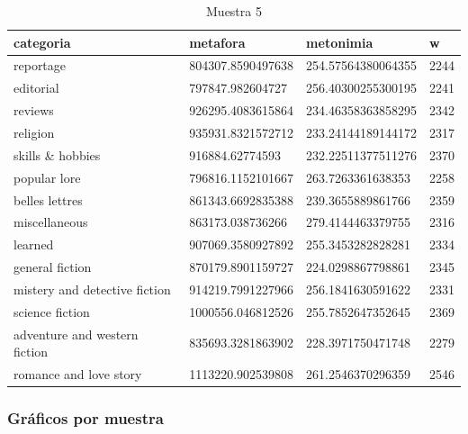 \documentclass[twoside]{article}
\begin{document}
\begin{center}
\begin{longtable}{| p{} | p{} | p{}|p{}|}
\caption{Muestra 5}
    \hline
        categoria & metafora & metonimia & w \\ \hline
        reportage & 804307.8590497638 & 254.57564380064355 & 2244 \\ \hline
        editorial & 797847.982604727 & 256.40300255300195 & 2241 \\ \hline
        reviews & 926295.4083615864 & 234.46358363858295 & 2342 \\ \hline
        religion & 935931.8321572712 & 233.24144189144172 & 2317 \\ \hline
        skills \& hobbies & 916884.62774593 & 232.22511377511276 & 2370 \\ \hline
        popular lore & 796816.1152101667 & 263.7263361638353 & 2258 \\ \hline
        belles lettres & 861343.6692835388 & 239.3655889861766 & 2359 \\ \hline
        miscellaneous & 863173.038736266 & 279.4144463379755 & 2316 \\ \hline
        learned & 907069.3580927892 & 255.3453282828281 & 2334 \\ \hline
        general fiction & 870179.8901159727 & 224.0298867798861 & 2345 \\ \hline
        mistery and detective fiction & 914219.7991227966 & 256.1841630591622 & 2331 \\ \hline
        science fiction & 1000556.046812526 & 255.7852647352645 & 2369 \\ \hline
        adventure and western fiction & 835693.3281863902 & 228.3971750471748 & 2279 \\ \hline
        romance and love story & 1113220.902539808 & 261.2546370296359 & 2546 \\ \hline
\end{longtable}
    \label{muestra5}
\end{center}
\subsubsection{Gráficos por muestra}
\label{sec:orgac271e7}
\end{document}
